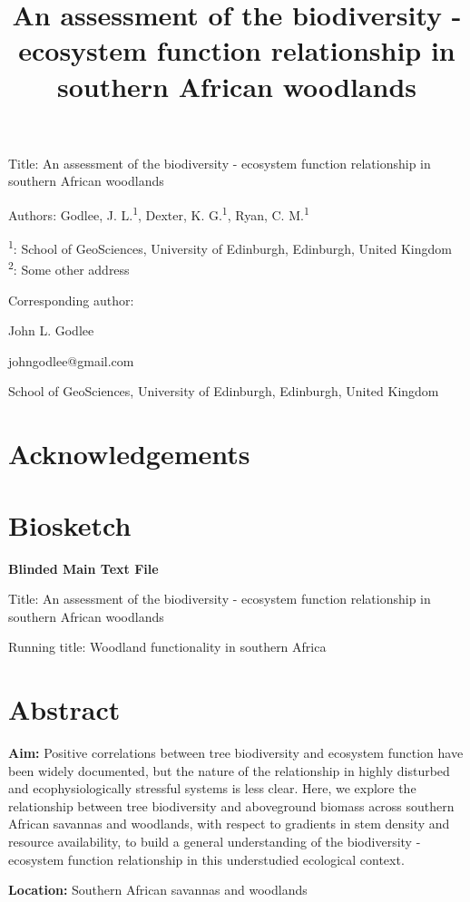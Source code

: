 \documentclass[11pt,a4paper]{article}
\title{An assessment of the biodiversity - ecosystem function relationship in southern African woodlands}
\author{}
\date{}
\begin{document}
{\LARGE{Title: An assessment of the biodiversity - ecosystem function relationship in southern African woodlands}}

\vspace{1cm}

Authors: Godlee, J. L.\textsuperscript{1}, Dexter, K. G.\textsuperscript{1}, Ryan, C. M.\textsuperscript{1}

\textsuperscript{1}: School of GeoSciences, University of Edinburgh, Edinburgh, United Kingdom \\
\textsuperscript{2}: Some other address

\vspace{1em}
Corresponding author:

John L. Godlee

johngodlee@gmail.com

School of GeoSciences, University of Edinburgh, Edinburgh, United Kingdom


\section*{Acknowledgements}

\section*{Biosketch}
\newpage{}

{\LARGE{\textbf{Blinded Main Text File}}}

\LARGE{Title: An assessment of the biodiversity - ecosystem function relationship in southern African woodlands}

\normalsize{Running title: Woodland functionality in southern Africa}

\section*{Abstract}

\textbf{Aim:} Positive correlations between tree biodiversity and ecosystem function have been widely documented, but the nature of the relationship in highly disturbed and ecophysiologically stressful systems is less clear. Here, we explore the relationship between tree biodiversity and aboveground biomass across southern African savannas and woodlands, with respect to gradients in stem density and resource availability, to build a general understanding of the biodiversity - ecosystem function relationship in this understudied ecological context.

\textbf{Location:} Southern African savannas and woodlands
\end{document}
